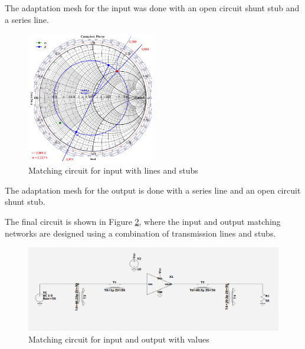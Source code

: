 The adaptation mesh for the input was done with an open circuit shunt stub and a series line. 

\begin{figure}[H]
    \centering
    \includegraphics[width=0.5\textwidth]{Images/zl-LS-matching.png}
    \caption{Matching circuit for input with lines and stubs}
    \label{fig:zl-line-matching}
\end{figure}

The adaptation mesh for the output is done with a series line and an open circuit shunt stub.

The final circuit is shown in Figure \ref{fig:MatchingCircuit-line}, where the input and output matching networks are designed using a combination of transmission lines and stubs.

\begin{figure}[H]
    \centering
    \includegraphics[width=1\textwidth]{Images/LS_matching-circuit.png}
    \caption{Matching circuit for input and output with values}
    \label{fig:MatchingCircuit-line}
\end{figure}

